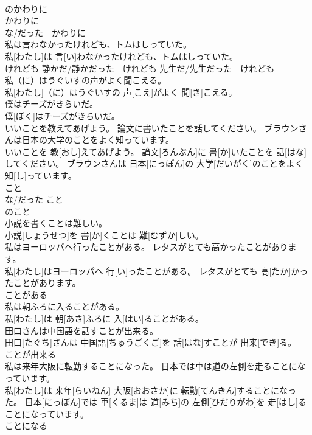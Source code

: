 \documentclass[8pt]{extreport}
\begin{document}
\begin{CJK}{UTF8}{min}
\\	のかわりに 
\\	かわりに 
\\	な/だった　かわりに	
\\	私は言わなかったけれども、トムはしっていた。	
\\	私[わたし]は 言[い]わなかったけれども、トムはしっていた。	
\\	けれども 静かだ/静かだった　けれども 先生だ/先生だった　けれども	
\\	私（に）はうぐいすの声がよく聞こえる。	
\\	私[わたし]（に）はうぐいすの 声[こえ]がよく 聞[き]こえる。	
\\	僕はチーズがきらいだ。	
\\	僕[ぼく]はチーズがきらいだ。	
\\	いいことを教えてあげよう。 論文に書いたことを話してください。 ブラウンさんは日本の大学のことをよく知っています。	
\\	いいことを 教[おし]えてあげよう。 論文[ろんぶん]に 書[か]いたことを 話[はな]してください。 ブラウンさんは 日本[にっぽん]の 大学[だいがく]のことをよく 知[し]っています。	
\\	こと 
\\	な/だった こと 
\\	のこと	
\\	小説を書くことは難しい。	
\\	小説[しょうせつ]を 書[か]くことは 難[むずか]しい。	
\\	私はヨーロッパへ行ったことがある。 レタスがとても高かったことがあります。	
\\	私[わたし]はヨーロッパへ 行[い]ったことがある。 レタスがとても 高[たか]かったことがあります。	
\\	ことがある	
\\	私は朝ふろに入ることがある。	
\\	私[わたし]は 朝[あさ]ふろに 入[はい]ることがある。	
\\	田口さんは中国語を話すことが出来る。	
\\	田口[たぐち]さんは 中国語[ちゅうごくご]を 話[はな]すことが 出来[でき]る。	
\\	ことが出来る	
\\	私は来年大阪に転勤することになった。 日本では車は道の左側を走ることになっています。	
\\	私[わたし]は 来年[らいねん] 大阪[おおさか]に 転勤[てんきん]することになった。 日本[にっぽん]では 車[くるま]は 道[みち]の 左側[ひだりがわ]を 走[はし]ることになっています。	
\\	ことになる	

\end{CJK}
\end{document}

